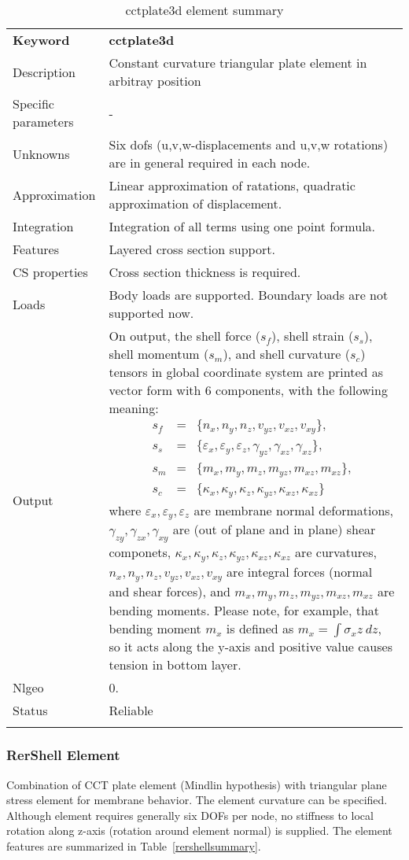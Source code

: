\documentclass[a4paper]{article}
\newcommand{\param}[1]{\texttt{#1}} %
\newcommand{\templabel}{}%
\newcommand{\tempcaption}{}%
\newcounter{nelpar}
\newenvironment{elementsummary}[5]{%
  \gdef\tempcaption{#4}%
  \gdef\templabel{#5}%
  \setcounter{nelpar}{0}%
  \begin{center} %
    \begin{table}[!htb] %
      \begin{tabular}{|l|p{9cm}|}\hline %
        {\bf Keyword} & \bf{#1}\\ %
        {Description} & {#2}\\ %
        {Specific parameters} & {#3}\\ \hline %
}{
  \\ \hline %
      \end{tabular}%
      \caption{\tempcaption}%
      \label{\templabel}%
    \end{table}%
  \end{center}%
}
\newcommand{\elementParam}[1]{%
  \ifthenelse{\value{nelpar}>0} %
             {&{#1}}%
             {\setcounter{nelpar}{1}Parameters&{#1}}%
             \\%
}
\newcommand{\elementDescription}[2]{{#1} & {#2}\\ }
\begin{document}
\begin{elementsummary}{cctplate3d}{Constant curvature triangular plate element in arbitray position}{-}{cctplate3d element summary}{cctplate3dsummary}
\elementDescription{Unknowns}{Six dofs (u,v,w-displacements and u,v,w rotations) are in general required in each node.}
\elementDescription{Approximation}{Linear approximation of ratations, quadratic approximation of displacement.}
\elementDescription{Integration}{Integration of all terms using one point formula.}
\elementDescription{Features}{Layered cross section support.}
\elementDescription{CS properties}{Cross section thickness is required.}
\elementDescription{Loads}{Body loads are supported. Boundary loads are not supported now.}
\elementDescription{Output}{On output, the shell force ($s_f$), shell strain ($s_s$), shell momentum ($s_m$), and shell curvature ($s_c$) tensors in global coordinate system are printed as vector form with 6 components, with the following meaning:
\begin{eqnarray*}
s_f&=&\{n_x, n_y, n_z, v_{yz}, v_{xz}, v_{xy}\},\\
s_s&=&\{\varepsilon_x, \varepsilon_y, \varepsilon_z, \gamma_{yz}, \gamma_{xz}, \gamma_{xz}\},\\
s_m&=&\{m_x, m_y, m_z, m_{yz}, m_{xz}, m_{xz}\},\\
s_c&=&\{\kappa_x, \kappa_y, \kappa_z, \kappa_{yz}, \kappa_{xz}, \kappa_{xz}\}
\end{eqnarray*}
where $\varepsilon_x, \varepsilon_y, \varepsilon_z$ are membrane normal deformations, $\gamma_{zy}, \gamma_{zx}, \gamma_{xy}$ are (out of plane and in plane) shear componets, $\kappa_x, \kappa_y, \kappa_z, \kappa_{yz}, \kappa_{xz}, \kappa_{xz}$ are curvatures, $n_x, n_y, n_z, v_{yz}, v_{xz}, v_{xy}$ are integral forces (normal and shear forces), and $m_x, m_y, m_z, m_{yz}, m_{xz}, m_{xz}$ are bending moments. 
Please note, for example, that bending moment $m_x$ is defined as $m_x=\int \sigma_x z\ dz$, so it acts along the y-axis and positive value causes tension in bottom layer.}
\elementDescription{Nlgeo}{0.}
\elementDescription{Status}{Reliable}
\end{elementsummary}


\subsubsection {RerShell Element}
Combination of CCT plate element (Mindlin hypothesis) with triangular plane stress element
for membrane behavior. The element curvature can be specified. 
Although element requires generally six DOFs per node, no stiffness to
local rotation along z-axis (rotation around element normal) is supplied. 
The element features are summarized in Table~\ref{rershellsummary}.
\end{document}
